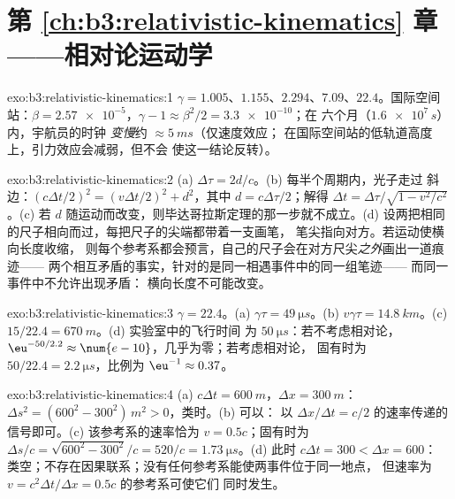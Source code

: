 \section*{第 \ref{ch:b3:relativistic-kinematics} 章——相对论运动学}

\begin{solution}{exo:b3:relativistic-kinematics:1}
$\gamma = 1.005$、$1.155$、$2.294$、$7.09$、$22.4$。国际空间站：$\beta =
\num{2.57e-5}$，$\gamma - 1 \approx \beta^2/2 = \num{3.3e-10}$；在
六个月（$\num{1.6e7}{}\,\unit{s}$）内，宇航员的时钟
\emph{变慢}约 $\approx\qty{5}{ms}$（仅速度效应；
在国际空间站的低轨道高度上，引力效应会减弱，但不会
使这一结论反转）。
\end{solution}

\begin{solution}{exo:b3:relativistic-kinematics:2}
(a) $\Delta\tau = 2d/c$。(b) 每半个周期内，光子走过
斜边：$(c\Delta t/2)^2 = (v\Delta t/2)^2 + d^2$，其中 $d =
c\Delta\tau/2$；解得 $\Delta t = \Delta\tau/\sqrt{1 - v^2/c^2}$。(c)
若 $d$ 随运动而改变，则毕达哥拉斯定理的那一步就不成立。(d)
设两把相同的尺子相向而过，每把尺子的尖端都带着一支画笔，
笔尖指向对方。若运动使横向长度收缩，
则每个参考系都会预言，自己的尺子会在对方尺尖\emph{之外}画出一道痕迹——
两个相互矛盾的事实，针对的是同一相遇事件中的同一组笔迹——
而同一事件中不允许出现矛盾：
横向长度不可能改变。
\end{solution}

\begin{solution}{exo:b3:relativistic-kinematics:3}
$\gamma = 22.4$。(a) $\gamma\tau = \qty{49}{\micro s}$。(b) $v\gamma
\tau = \qty{14.8}{km}$。(c) $15/22.4 = \qty{670}{m}$。(d) 实验室中的飞行时间
为 $\qty{50}{\micro s}$：若不考虑相对论，
$\eu^{-50/2.2} \approx \num{e-10}$，几乎为零；若考虑相对论，
固有时为 $50/22.4 = \qty{2.2}{\micro s}$，比例为 $\eu^{-1}
\approx 0.37$。
\end{solution}

\begin{solution}{exo:b3:relativistic-kinematics:4}
(a) $c\Delta t = \qty{600}{m}$，$\Delta x = \qty{300}{m}$：$\Delta s^2
= (600^2 - 300^2)\,\unit{m^2} > 0$，类时。(b) 可以：
以 $\Delta x/\Delta t = c/2$ 的速率传递的信号即可。(c) 该参考系的速率恰为 $v =
0.5c$；固有时为 $\Delta s/c = \sqrt{600^2 - 300^2}/c = 520/c =
\qty{1.73}{\micro s}$。(d) 此时 $c\Delta t = 300 < \Delta x = 600$：
类空；不存在因果联系；没有任何参考系能使两事件位于同一地点，
但速率为 $v = c^2\Delta t/\Delta x = 0.5c$ 的参考系可使它们
同时发生。
\end{solution}


